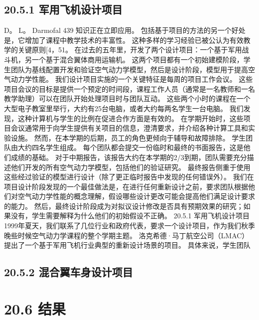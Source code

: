 \documentclass[UTF8,11pt,a4paper,openany,fontset=fandol]{ctexbook}
\begin{document}
\subsection{20.5.1 军用飞机设计项目}
D。 L。 Darmofal 439 知识正在立即应用。 包括基于项目的方法的另一个好处是，它增加了课程中教学技术的丰富性。 这种多样的学习经验已被公认为有效教学的关键原则[4，51。 在过去的五年里，开发了两个设计项目：一个基于军用战斗机，另一个基于混合翼体商用运输机。 这两个项目都有一个初始建模阶段，学生团队为基线配置开发和验证空气动力学模型，然后是设计阶段，模型用于提高空气动力学性能。 我们设计项目实施的一个关键特征是每周的项目工作会议。 这些项目会议的目标是提供一个预定的时间段，课程工作人员（通常是一名教师和一名教学助理）可以在团队开始处理项目时与团队互动。 这些两个小时的课程在一个大型电子教室里举行，大约有25台电脑，或者大约每两名学生一台电脑。 我们发现，这种计算机与学生的比例在促进合作方面是有效的。 在学期开始时，这些项目会议通常用于向学生提供有关项目的信息，澄清要求，并介绍各种计算工具和实验设施。 然而，在本学期的后期，员工的角色更倾向于辅导和故障排除。 学生团队由大约四名学生组成。 每个团队都会提交一份临时和最终的书面报告，这是他们成绩的基础。 对于中期报告，该报告大约在本学期的2/3到期，团队需要充分描述他们开发的所有空气动力学模型，包括他们的验证研究。 最终报告侧重于使用这些经过验证的模型进行设计（除了更正临时报告中发现的任何错误外）。 我们在项目设计阶段发现的一个最佳做法是，在进行任何重新设计之前，要求团队根据他们对空气动力学性能的概念理解，假设哪些设计更改可能会提高他们满足设计要求的能力。 然后，最终设计阶段成为对拟议设计修改是否具有预期效果的研究；如果没有，学生需要解释为什么他们的初始假设不正确。 20.5.1 军用飞机设计项目 1999年夏天，我们联系了几位行业和政府代表，要求一个设计项目，作为我们秋季晚些时候空气动力学课程的整个学期主题。 洛克希德·马丁航空公司（LMAC）提出了一个基于军用飞机行业典型的重新设计场景的项目。 具体来说，学生团队

\subsection{20.5.2 混合翼车身设计项目}
\section{20.6 结果}
\end{document}
